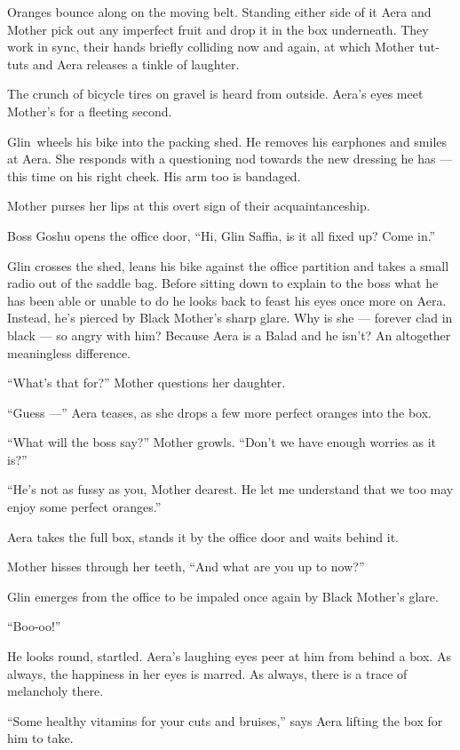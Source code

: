 \documentclass[twoside,11pt,openany]{book}
\begin{document}
Oranges bounce along on the moving belt. Standing either side of it Aera and Mother pick out any imperfect fruit and
drop it in the box underneath. They work in sync, their hands briefly colliding now and again, at which Mother tut-tuts
and Aera releases a tinkle of laughter.

The crunch of bicycle tires on gravel is heard from outside. Aera's eyes meet Mother's for a fleeting second.

Glin~wheels his bike into the packing shed. He removes his earphones and smiles at Aera. She responds with a questioning
nod towards the new dressing he has --- this time on his right cheek. His arm too is bandaged.

Mother purses her lips at this overt sign of their acquaintanceship.

Boss Goshu opens the office door, ``Hi, Glin Saffia, is it all fixed up? Come in.''

Glin crosses the shed, leans his bike against the office partition and takes a small radio out of the saddle bag. Before
sitting down to explain to the boss what he has been able or unable to do he looks back to feast his eyes once more on
Aera. Instead, he's pierced by Black Mother's sharp glare. Why is she --- forever clad in black --- so angry with him?
Because Aera is a Balad and he isn't? An altogether meaningless difference.

``What's that for?'' Mother questions her daughter.

``Guess ---'' Aera teases, as she drops a few more perfect oranges into the box.

``What will the boss say?'' Mother growls. ``Don't we have enough worries as it
is?''

``He's not as fussy as you, Mother dearest. He let me understand that we too may enjoy some perfect
oranges.''

Aera takes the full box, stands it by the office door and waits behind it.

Mother hisses through her teeth, ``And what are you up to now?''

Glin emerges from the office to be impaled once again by Black Mother's glare.

``Boo-oo!''

He looks round, startled. Aera's laughing eyes peer at him from behind a box. As always, the happiness in her eyes is
marred. As always, there is a trace of melancholy there.

``Some healthy vitamins for your cuts and bruises,'' says Aera lifting the box for him to
take.
\end{document}
